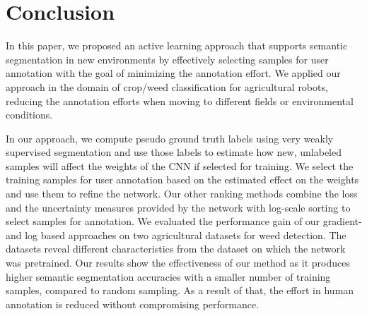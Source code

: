 \documentclass[letterpaper, 10 pt, conference]{ieeeconf}  %
\begin{document}
\section{Conclusion}
\label{sec:conclusion}

In this paper, we proposed an active learning approach that supports semantic
segmentation in new environments by effectively selecting samples for user
annotation with the goal of minimizing the annotation effort. We applied our
approach in the domain of crop/weed classification for agricultural robots,
reducing the annotation efforts when moving to different fields or environmental
conditions.

In our approach, we compute pseudo ground truth labels using very weakly supervised 
segmentation and use those labels to estimate how new, unlabeled samples will 
affect the weights of the CNN if selected for training. We select the training
samples for user annotation based on the estimated effect on the weights and use them to refine the 
network. Our other ranking methods combine the loss and the uncertainty measures provided by the network with 
log-scale sorting to select samples for annotation.
We evaluated  the performance gain of our gradient-and log based 
approaches on two agricultural  datasets for weed detection. The datasets 
reveal different characteristics from the dataset on which the network was pretrained.
Our results show the effectiveness of our method as it produces higher semantic segmentation
accuracies with a smaller number of training samples, compared to random sampling. As a result
of that, the effort in human annotation is reduced without compromising
performance.
 
\clearpage



\end{document}

